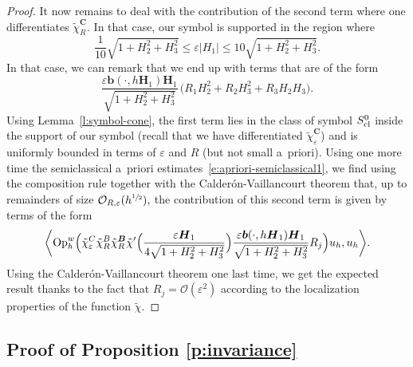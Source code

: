 \documentclass[10pt]{amsart}
\theoremstyle{plain}
\theoremstyle{definition}
\theoremstyle{remark}
\newcommand{\Op}{\operatorname{Op}}
\begin{document}
\begin{proof}
It now remains to deal with the contribution of the second term where one differentiates $\tilde{\chi}_R^{\boldsymbol{C}}$. In that case, our symbol is supported in the region where
\[
\frac{1}{10}\sqrt{1+H_2^2+H_3^2}\leq \varepsilon|H_1|\leq 10\sqrt{1+H_2^2+H_3^2}.
\]
In that case, we can remark that we end up with terms that are of the form
\[
\frac{\varepsilon \boldsymbol{b}(\cdot,h\boldsymbol{H}_1)\boldsymbol{H}_1}{\sqrt{1+H_2^2+H_3^2}}\,\bigl(R_1H_2^2+R_2H_3^2+R_3H_2H_3\bigr).
\]
Using Lemma~\ref{l:symbol-cone}, the first term lies in the class of symbol $S^0_{\textup{cl}}$ inside the support of our symbol (recall that we have differentiated $\tilde{\chi}_{\varepsilon}^{\boldsymbol{C}}$) and is uniformly bounded in terms of $\varepsilon$ and $R$ (but not small a~priori). Using one more time the semiclassical a~priori estimates~\eqref{e:apriori-semiclassical1}, we find using the composition rule together with the Calderón-Vaillancourt theorem that, up to remainders of size $\mathcal{O}_{R,\varepsilon}(h^{\sfrac{1}{2}}),$ the contribution of this second term is given by terms of the form
\[
\biggl\langle\Op_h^w\Bigl(\tilde{\chi}_\varepsilon^C\tilde{\chi}_R^B\tilde{\chi}_R^{\boldsymbol{B}}\tilde{\chi}'\Bigl(\frac{\varepsilon\boldsymbol{H}_1}{4\sqrt{1+H_2^2+H_3^2}}\Bigr)\frac{\varepsilon \boldsymbol{b}(\cdot,h\boldsymbol{H}_1)\boldsymbol{H}_1}{\sqrt{1+H_2^2+H_3^2}}R_j\Bigr)u_h,u_h\biggr\rangle.
\]
Using the Calderón-Vaillancourt theorem one last time, we get the expected result thanks to the fact that $R_j=\mathcal{O}(\varepsilon^2)$ according to the localization properties of the function $\tilde{\chi}$.
\end{proof}

\subsection{Proof of Proposition \ref{p:invariance}}
\end{document}

